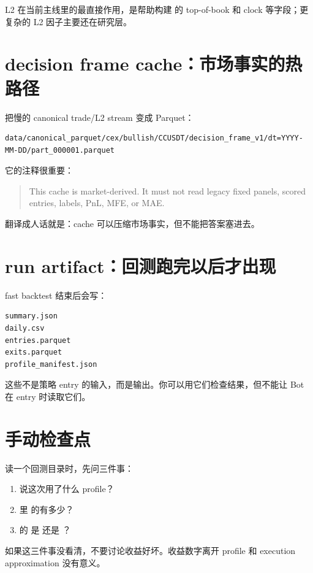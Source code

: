 
L2 在当前主线里的最直接作用，是帮助构建  的 top-of-book 和 clock 等字段；更复杂的 L2 因子主要还在研究层。

\section{decision frame cache：市场事实的热路径}

 把慢的 canonical trade/L2 stream 变成 Parquet：

\begin{lstlisting}
data/canonical_parquet/cex/bullish/CCUSDT/decision_frame_v1/dt=YYYY-MM-DD/part_000001.parquet
\end{lstlisting}

它的注释很重要：

\begin{quote}
This cache is market-derived. It must not read legacy fixed panels, scored entries, labels, PnL, MFE, or MAE.
\end{quote}

翻译成人话就是：cache 可以压缩市场事实，但不能把答案塞进去。

\section{run artifact：回测跑完以后才出现}

fast backtest 结束后会写：

\begin{lstlisting}
summary.json
daily.csv
entries.parquet
exits.parquet
profile_manifest.json
\end{lstlisting}

这些不是策略 entry 的输入，而是输出。你可以用它们检查结果，但不能让 Bot 在 entry 时读取它们。

\section{手动检查点}

读一个回测目录时，先问三件事：

\begin{enumerate}[leftmargin=2em]
  \item {} 说这次用了什么 profile？
  \item {} 里  的有多少？
  \item {} 的  是  还是 ？
\end{enumerate}

如果这三件事没看清，不要讨论收益好坏。收益数字离开 profile 和 execution approximation 没有意义。


